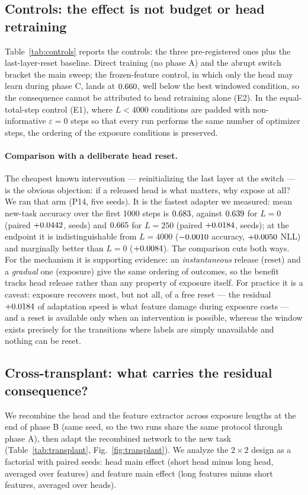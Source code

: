 \documentclass[review,12pt]{elsarticle}
\begin{document}
\subsection{Controls: the effect is not budget or head retraining}
\label{sec:r-controls}
Table~\ref{tab:controls} reports the controls: the three pre-registered ones
plus the last-layer-reset baseline. Direct training
(no phase A) and the abrupt switch bracket the main sweep; the frozen-feature
control, in which only the head may learn during phase C, lands at
$0.660$, well below the best windowed condition, so the
consequence cannot be attributed to head retraining alone (E2). In the
equal-total-step control (E1), where $L<4000$ conditions are padded with
non-informative $\varepsilon=0$ steps so that every run performs the same
number of optimizer steps, the ordering of the exposure conditions is
preserved.



\paragraph{Comparison with a deliberate head reset.}
The cheapest known intervention --- reinitializing the last layer at the switch
\cite{faia2024reset} --- is the obvious objection: if a released head is what
matters, why expose at all? We ran that arm (P14, five seeds). It is the
fastest adapter we measured: mean new-task accuracy over the first 1000 steps
is $0.683$, against $0.639$ for $L{=}0$ (paired $+0.0442$,
\DSpdResetLzeroPos{} seeds) and $0.665$ for $L{=}250$ (paired
$+0.0184$, \DSpdResetLtwoFPos{} seeds); at the endpoint it is
indistinguishable from $L{=}4000$ ($-0.0010$ accuracy,
$+0.0050$ NLL) and marginally better than $L{=}0$
($+0.0084$). The comparison cuts both ways. For the mechanism it is
supporting evidence: an \emph{instantaneous} release (reset) and a
\emph{gradual} one (exposure) give the same ordering of outcomes, so the
benefit tracks head release rather than any property of exposure itself. For
practice it is a caveat: exposure recovers most, but not all, of a free reset
--- the residual $+0.0184$ of adaptation speed is what feature damage
during exposure costs --- and a reset is available only when an intervention
is possible, whereas the window exists precisely for the transitions where
labels are simply unavailable and nothing can be reset.

\subsection{Cross-transplant: what carries the residual consequence?}
\label{sec:r-transplant}
We recombine the head and the feature extractor across exposure lengths at the
end of phase B (same seed, so the two runs share the same protocol through
phase A), then adapt the recombined network to the new task
(Table~\ref{tab:transplant}, Fig.~\ref{fig:transplant}). We analyze the
$2\times2$ design as a factorial with paired seeds:
head main effect (short head minus long head, averaged over features) and
feature main effect (long features minus short features, averaged over heads).
\end{document}
